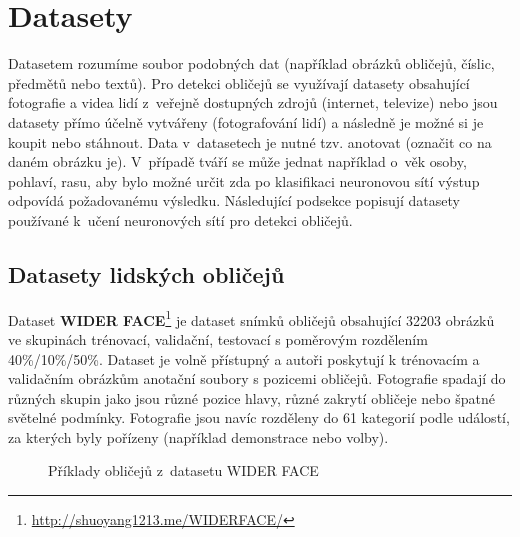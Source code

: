 \section{Datasety}
\label{sekce:datasety}
Datasetem rozumíme soubor podobných dat (například obrázků obličejů, číslic, předmětů nebo textů). Pro detekci obličejů se využívají datasety obsahující fotografie a videa lidí z~veřejně dostupných zdrojů (internet, televize) nebo jsou datasety přímo účelně vytvářeny (fotografování lidí) a následně je možné si je koupit nebo stáhnout. Data v~datasetech je nutné tzv. anotovat (označit co na daném obrázku je). V~případě tváří se může jednat například o~věk osoby, pohlaví, rasu, aby bylo možné určit zda po klasifikaci neuronovou sítí výstup odpovídá požadovanému výsledku. Následující podsekce popisují datasety používané k~učení neuronových sítí pro detekci obličejů.

\subsection*{Datasety lidských obličejů}
Dataset \textbf{WIDER FACE}\footnote{\url{http://shuoyang1213.me/WIDERFACE/}} je dataset snímků obličejů obsahující 32203 obrázků ve skupinách trénovací, validační, testovací s poměrovým rozdělením 40\%/10\%/50\%. Dataset je volně přístupný a autoři poskytují k trénovacím a validačním obrázkům anotační soubory s pozicemi obličejů. Fotografie spadají do různých skupin jako jsou různé pozice hlavy, různé zakrytí obličeje nebo špatné světelné podmínky. Fotografie jsou navíc rozděleny do 61 kategorií podle událostí, za kterých byly pořízeny (například demonstrace nebo volby).

\begin{figure}[H]
  \begin{center}
  \label{obrazek:celeba}
  \caption{Příklady obličejů z~datasetu WIDER FACE}
  \end{center}
\end{figure}

